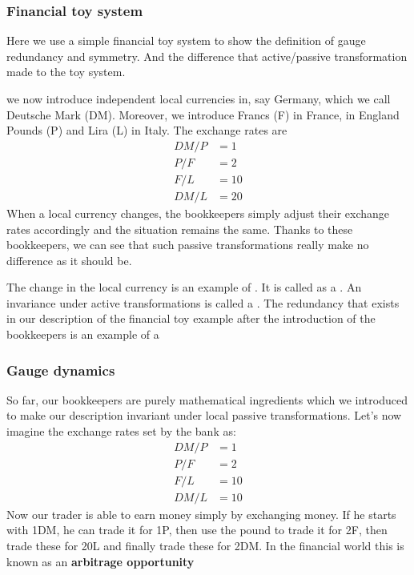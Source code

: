 \subsubsection{Financial toy system}
Here we use a simple financial toy system to show the definition of gauge redundancy and symmetry. And the difference that active/passive transformation made to the toy system. 

we now introduce independent local currencies in, say Germany, which we call Deutsche Mark (DM). Moreover, we introduce Francs (F) in France, in England Pounds (P) and Lira (L) in Italy. The exchange rates are
$$
\begin{aligned}
D M / P &=1 \\
P / F &=2 \\
F / L &=10 \\
D M / L &=20
\end{aligned}
$$
When a local currency changes, the bookkeepers simply adjust their exchange rates accordingly and the situation remains the same. Thanks to these bookkeepers, we can see that such passive transformations really make no difference as it should be.

The change in the local currency is an example of . It is called as a \textbf{}. An invariance under active transformations is called a \textbf{}. The redundancy that exists in our description of the financial toy example after the introduction of the bookkeepers is an example of a \textbf{}
\subsubsection{Gauge dynamics}
So far, our bookkeepers are purely mathematical ingredients which we introduced to make our description invariant under local passive transformations. Let's now imagine the exchange rates set by the bank as:
$$
\begin{aligned}
D M / P &=1 \\
P / F &=2 \\
F / L &=10 \\
D M / L &=10
\end{aligned}
$$
Now our trader is able to earn money simply by exchanging money. If he starts with 1DM, he can trade it for 1P, then use the pound to trade it for 2F, then trade these for 20L and finally trade these for 2DM. In the financial world this is known as an \textbf{arbitrage opportunity}

